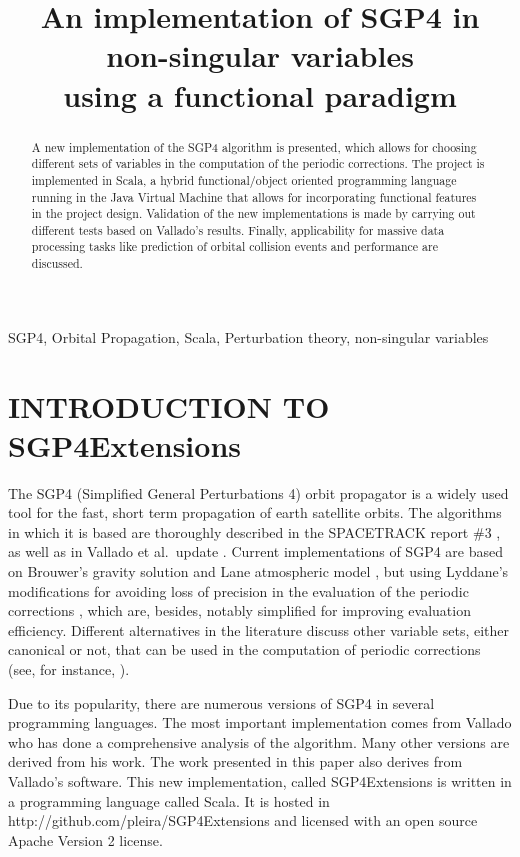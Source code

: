 \documentclass{article}
\title{An implementation of SGP4 in non-singular variables \\
              using a functional paradigm}
\begin{document}
%
\maketitle
%
\begin{abstract}

A new implementation of the SGP4 algorithm is presented, which allows for choosing different sets of variables in the computation of the periodic corrections. The project is implemented in Scala, a hybrid functional/object oriented programming language running in the Java Virtual Machine that allows for incorporating functional features in the project design.
Validation of the new implementations is made by carrying out different tests based on Vallado's results. Finally, applicability for massive data processing tasks like prediction of orbital collision events and performance are discussed.

\end{abstract}
%
\begin{keywords}
SGP4, Orbital Propagation, Scala, Perturbation theory, non-singular variables
\end{keywords}
%

\section{INTRODUCTION TO SGP4Extensions} \label{sec:intro}

The SGP4 (Simplified General Perturbations 4) orbit propagator is a widely used tool for the fast, short term propagation of earth satellite orbits. The algorithms in which it is based are thoroughly described in the SPACETRACK report \#3 \cite{HootsRoehrich1980}, as well as in Vallado et al.~update \cite{ValladoCrawfordHujsakKelso2006}. Current implementations of SGP4 are based on Brouwer's gravity solution \cite{Brouwer1959} and Lane atmospheric model \cite{Lane1965}, but using Lyddane's modifications for avoiding loss of precision in the evaluation of the periodic corrections \cite{Lyddane1963}, which are, besides, notably simplified for improving evaluation efficiency. Different alternatives in the literature discuss other variable sets, either canonical or not, that can be used in the computation of periodic corrections (see, for instance, \cite{Izsak1963AJ,Aksnes1972,Hoots1981,Lara2015MPE}).
\par

Due to its popularity, there are numerous versions of SGP4 in several programming languages. The most important implementation comes from Vallado \cite{ValladoCrawfordHujsakKelso2006} who has done a comprehensive analysis of the algorithm. Many other versions are derived from his work. The work presented in this paper also derives from Vallado's software. This new implementation, called SGP4Extensions is written in a programming language called Scala. It is hosted in http://github.com/pleira/SGP4Extensions and licensed with an open source Apache Version 2 license.
\end{document}
